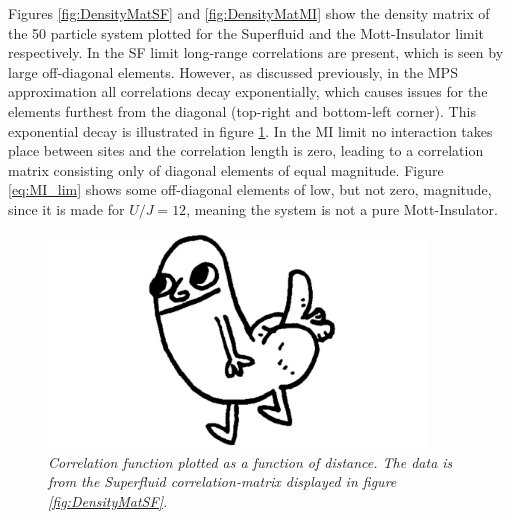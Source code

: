 Figures \ref{fig:DensityMatSF} and \ref{fig:DensityMatMI} show the density matrix of the 50 particle system plotted for the Superfluid and the Mott-Insulator limit respectively. In the SF limit long-range correlations are present, which is seen by large off-diagonal elements. However, as discussed previously, in the MPS approximation all correlations decay exponentially, which causes issues for the elements furthest from the diagonal (top-right and bottom-left corner). This exponential decay is illustrated in figure \ref{fig:expDecayCorrFunc}.
In the MI limit no interaction takes place between sites and the correlation length is zero,  leading to a correlation matrix consisting only of diagonal elements of equal magnitude. Figure \ref{eq:MI_lim} shows some off-diagonal elements of low, but not zero, magnitude, since it is made for $U/J = 12$, meaning the system is not a pure Mott-Insulator.
\begin{figure}[h!]
	\centering
	\includegraphics[width=0.9\textwidth]{Figures/placeholder.jpg}
	\caption{\textit{Correlation function plotted as a function of distance. The data is from the Superfluid correlation-matrix displayed in figure \ref{fig:DensityMatSF}.}}
	\label{fig:expDecayCorrFunc}
\end{figure}
